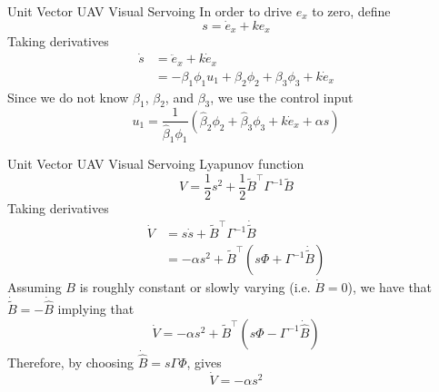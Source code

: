 \documentclass[9pt]{beamer}
\begin{document}
\begin{frame}{Unit Vector UAV Visual Servoing}
In order to drive $e_x$ to zero, define
\begin{equation}
s=\dot{e}_x+ke_x
\end{equation}
Taking derivatives 
\begin{align}
\dot{s}&=\ddot{e}_x+k\dot{e}_x
\\&=-\beta_1\phi_1u_1+\beta_2\phi_2+\beta_3\phi_3+k\dot{e}_x
\label{sdot}
\end{align}
 Since we do not know $\beta_1$, $\beta_2$, and $\beta_3$, we use the control input
 \begin{equation}
 u_1=\frac{1}{\hat{\beta}_1\phi_1}(\hat{\beta}_2\phi_2+\hat{\beta}_3\phi_3+k\dot{e}_x+\alpha s)
 \end{equation}
\end{frame}

\begin{frame}{Unit Vector UAV Visual Servoing}
Lyapunov function
\begin{equation}
V=\frac{1}{2}s^2+\frac{1}{2}\tilde{B}^\top \Gamma^{-1}\tilde{B}
\end{equation}
Taking derivatives
\begin{align}
\dot{V}&=s\dot{s}+\tilde{B}^\top \Gamma^{-1}\dot{\tilde{B}}
\\&=-\alpha s^2+\tilde{B}^\top(s\Phi+\Gamma^{-1}\dot{\tilde{B}})
\end{align}
Assuming $B$ is roughly constant or slowly varying (i.e. $\dot{B}=0$), we have that $\dot{\tilde{B}}=-\dot{\hat{B}}$ implying that
\begin{equation}
\dot{V}=-\alpha s^2+\tilde{B}^\top(s\Phi-\Gamma^{-1}\dot{\hat{B}})
\end{equation}
Therefore, by choosing $\dot{\hat{B}}=s\Gamma\Phi$, gives
\begin{equation}
\dot{V}=-\alpha s^2
\end{equation}
\end{frame}
\end{document}
